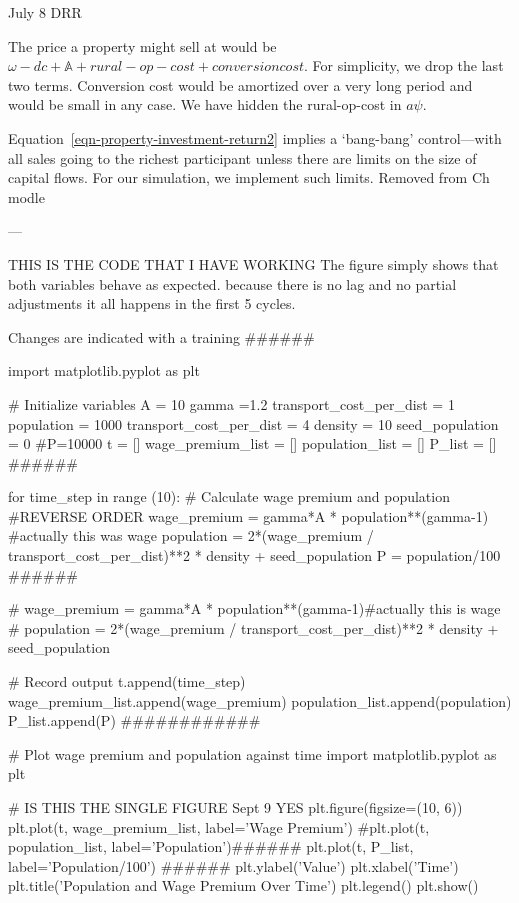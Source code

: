 July 8 DRR

The price a property might sell at would be $\omega - {dc} + \mathbb{A} + rural-op-cost + conversion cost$. For simplicity, we drop the last two terms. Conversion cost would be amortized over a very long period and would be small in any case. We have hidden the rural-op-cost in $a\psi$.


Equation~\ref{eqn-property-investment-return2} implies a `bang-bang' control---with all sales going to the richest participant unless there are limits on the size of capital flows. For our simulation, we implement such limits.  Removed from Ch modle 


---

THIS IS THE CODE THAT I HAVE WORKING
The figure simply shows that both variables behave as expected.
because there is no lag and no partial adjustments it all happens in the first 5 cycles.


Changes are indicated with a training ######

import matplotlib.pyplot as plt

# Initialize variables
A     = 10
gamma =1.2
transport_cost_per_dist = 1
population = 1000
transport_cost_per_dist = 4
density = 10
seed_population = 0
#P=10000
t = []
wage_premium_list = []
population_list   = []
P_list            = []   ######

for time_step in range (10):
    # Calculate wage premium and population #REVERSE ORDER
    wage_premium = gamma*A * population**(gamma-1) #actually this was wage
    population =  2*(wage_premium / transport_cost_per_dist)**2 * density + seed_population
    P = population/100  ######
    
    # wage_premium = gamma*A * population**(gamma-1)#actually this is wage
    # population = 2*(wage_premium / transport_cost_per_dist)**2 * density + seed_population

    # Record output
    t.append(time_step)
    wage_premium_list.append(wage_premium)
    population_list.append(population)
    P_list.append(P)    ############

# Plot wage premium and population against time
import matplotlib.pyplot as plt

# IS THIS THE SINGLE FIGURE   Sept 9 YES
plt.figure(figsize=(10, 6))
plt.plot(t, wage_premium_list, label='Wage Premium')
#plt.plot(t, population_list, label='Population')######
plt.plot(t, P_list, label='Population/100')      ######
plt.ylabel('Value')
plt.xlabel('Time')
plt.title('Population and Wage Premium Over Time')
plt.legend()
plt.show()




